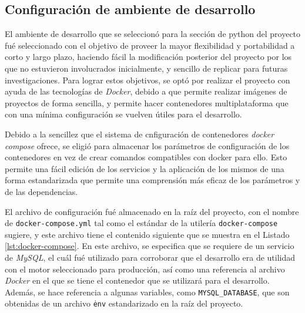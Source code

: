 \pagebreak

\subsection{Configuración de ambiente de
desarrollo}\label{configuraciuxf3n-de-ambiente-de-desarrollo}

El ambiente de desarrollo que se seleccionó para la sección de python del proyecto fué seleccionado con el objetivo de proveer la mayor flexibilidad y portabilidad a corto y largo plazo, haciendo fácil la modificación posterior del proyecto por los que no estuvieron involucrados inicialmente, y sencillo de replicar para futuras investigaciones. Para lograr estos objetivos, se optó por realizar el proyecto con ayuda de las tecnologías de \textit{Docker}, debido a que permite realizar imágenes de proyectos de forma sencilla, y permite hacer contenedores multiplataforma que con una mínima configuración se vuelven útiles para el desarrollo.


Debido a la sencillez que el sistema de cnfiguración de contenedores \emph{docker compose} ofrece, se eligió para almacenar los parámetros de configuración de los contenedores en vez de crear comandos compatibles con docker para ello. Esto permite una fácil edición de los servicios y la aplicación de los mismos de una forma estandarizada que permite una comprensión más eficaz de los parámetros y de las dependencias.

El archivo de configuración fué almacenado en la raíz del proyecto, con el nombre de \texttt{docker-compose.yml}  tal como el estándar de la utilería \texttt{docker-compose} sugiere, y este archivo tiene el contenido siguiente que se muestra en el Listado \ref{lst:docker-compose}. En este archivo, se especifica que se requiere de un servicio de \textit{MySQL}, el cuál fué utilizado para corroborar que el desarrollo era de utilidad con el motor seleccionado para producción, así como una referencia al archivo \textit{Docker} en el que se tiene el contenedor que se utilizará para el desarrollo. Además, se hace referencia a algunas variables, como \texttt{MYSQL\_DATABASE}, que son obtenidas de un archivo \texttt{\.env} estandarizado en la raíz del proyecto.

